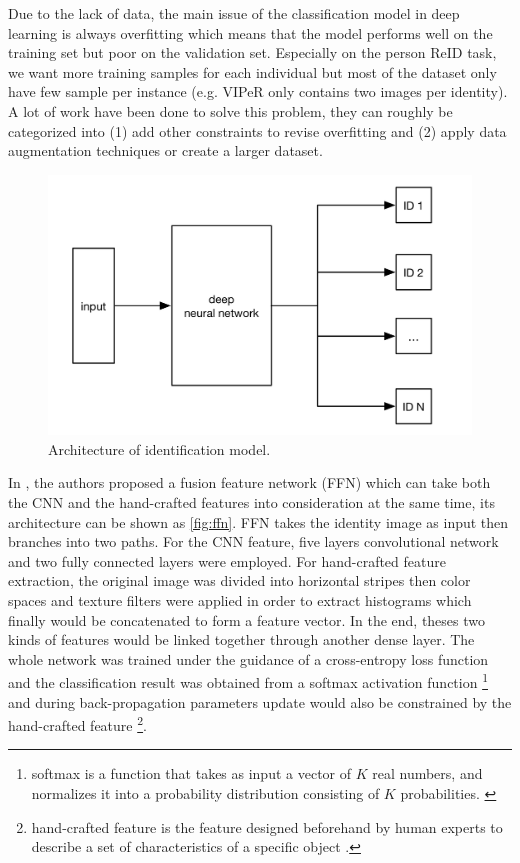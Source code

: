 Due to the lack of data, the main issue of the classification model in deep
learning is always overfitting which means that the model performs well 
on the training set but poor on the validation set. Especially on the person 
ReID task, we want more training samples for each individual but most of the 
dataset only have few sample per instance (e.g. VIPeR only contains two images 
per identity). A lot of work have been done to solve this problem, they can  
roughly be categorized into
(1) add other constraints to revise overfitting and
(2) apply data augmentation techniques or create a larger dataset.

\begin{figure}
    \begin{center}
    \includegraphics[scale=0.8]{figures/id_model.png}
    \end{center}
    \caption{Architecture of identification model.}
    \label{fig:id-model}
\end{figure}

In \cite{feature-fusion-net-2016}, the authors proposed a fusion feature
network (FFN) which can take both the CNN and the hand-crafted 
features into consideration at the same time, its architecture can be shown as
\autoref{fig:ffn}. FFN takes the identity image as input then branches into two
paths. 
For the CNN feature, five layers convolutional network and two fully 
connected layers were employed. For hand-crafted feature extraction, the 
original image was divided into horizontal stripes then color spaces and 
texture filters were applied in order to extract histograms which finally would 
be concatenated to form a feature vector. 
In the end, theses two kinds of features would be linked together through 
another dense layer. The whole network was trained under the guidance of 
a cross-entropy loss function and the classification result
was obtained from a softmax activation function 
\footnote{softmax is a function that takes as input a 
vector of $K$ real numbers, and normalizes it into a probability distribution 
consisting of $K$ probabilities. \cite{wikipedia-software-framework}} 
and during back-propagation parameters update would
also be constrained by the hand-crafted feature \footnote{hand-crafted feature 
is the feature designed beforehand by human experts to describe a set of  
characteristics of a specific object 
\cite{handcrafted-vs-deep-learning-features}.}.


